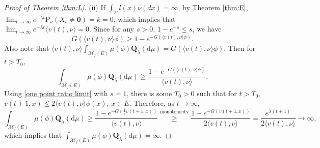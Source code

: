 \documentclass[12pt,a4paper]{amsart}
\numberwithin{equation}{section}
\theoremstyle{plain}
\theoremstyle{definition}
\theoremstyle{remark}
\begin{document}
\begin{proof}[Proof of Theorem \ref{thm:L}]
(ii) If $\int_El(x)\nu(dx)=\infty$,
by Theorem \ref{thm:E}, 
$\lim_{t\to\infty}e^{-\lambda t}\mathrm P_\nu(X_t\neq \mathbf 0)=k=0$,
which implies that
 $\lim_{t\to\infty}e^{-\lambda t}\langle v(t),\nu\rangle=0$.  Since for any $s>0$,  $1-e^{-s}\leq s$, we have
$$G(\langle v(t),\nu\rangle\phi)\geq 1-e^{-G(\langle v(t),\nu\rangle\phi)}.$$
Also note that $\langle v(t),\nu\rangle
\int_{\mathcal M_f(E)}\mu(\phi)\mathbf Q_\lambda(\mathrm d\mu)=G(\langle v(t),\nu\rangle\phi).$
Then  for $t>T_0$,
\[
\int_{\mathcal M_f(E)}\mu(\phi)\mathbf Q_\lambda(\mathrm d\mu)
\geq \dfrac{1-e^{-G(\langle v(t),\nu\rangle\phi)}}{\langle v(t),\nu\rangle}.
\]
 Using \eqref{one point ratio limit} with $s=1$,
 there is some $T_0>0$ such that for $t>T_0$, $v(t+1,x)\leq 2\langle v(t),\nu\rangle\phi(x)$, $x\in E$.
 Therefore, as $t\to\infty$,
 \[
\int_{\mathcal M_f(E)}\mu(\phi)\mathbf Q_\lambda(\mathrm d\mu)
\geq \dfrac{1-e^{-G(\frac{1}{2}v(t+1,x))}}{\langle v(t),\nu\rangle}\overset{\text{monotonicity}}\geq
\dfrac{1-e^{-G(v(t+1,x))}}{2\langle v(t),\nu\rangle}
=\dfrac{e^{\lambda(t+1)}}{2\langle v(t),\nu\rangle}\to\infty, 
\]
which implies that 
$\int_{\mathcal M_f(E)}\mu(\phi)\mathbf Q_\lambda(\mathrm d\mu)=\infty$.


\end{proof}
\end{document}
